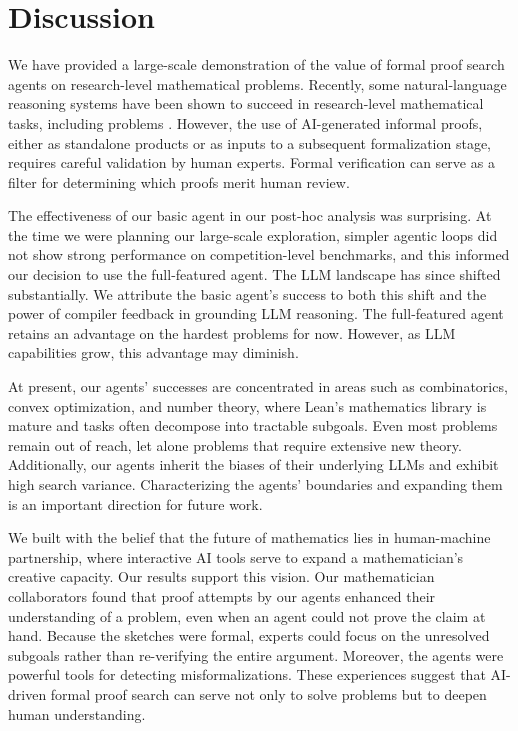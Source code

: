 \section{Discussion}

We have provided a large-scale demonstration of the value of formal proof search agents on research-level mathematical problems. 
Recently, some natural-language reasoning systems have been shown to succeed in research-level mathematical tasks, including {\erdos} problems \cite{feng2026aletheia, alexeev2026short2}. However, the use of AI-generated informal proofs, either as standalone products or as inputs to a subsequent formalization stage, requires careful validation by human experts. Formal verification can serve as a filter for determining which proofs merit human review. 

The effectiveness of our basic agent in our post-hoc analysis was surprising. At the time we were planning our large-scale exploration, simpler agentic loops did not show strong performance on competition-level benchmarks, and this informed our decision to use the full-featured agent. The LLM landscape has since shifted substantially. We attribute the basic agent's success to both this shift and the power of compiler feedback in grounding LLM reasoning. The full-featured agent retains an advantage on the hardest problems for now. However, as LLM capabilities grow, this advantage may diminish.

At present, our agents' successes are concentrated in areas such as combinatorics, convex optimization, and number theory, where Lean's mathematics library \cite{mathlib2020} is mature and tasks often decompose into tractable subgoals. Even most {\erdos} problems remain out of reach, let alone problems that require extensive new theory. Additionally, our agents inherit the biases of their underlying LLMs and exhibit high search variance. Characterizing the agents' boundaries and expanding them is an important direction for future work.

We built {\systemlong} with the belief that the future of mathematics lies in human-machine partnership, where interactive AI tools serve to expand a mathematician's creative capacity. Our results support this vision. Our mathematician collaborators found that proof attempts by our agents enhanced their understanding of a problem, even when an agent could not prove the claim at hand. Because the sketches were formal, experts could focus on the unresolved subgoals rather than re-verifying the entire argument. Moreover, the agents were powerful tools for detecting misformalizations. These experiences suggest that AI-driven formal proof search can serve not only to solve problems but to deepen human understanding.


